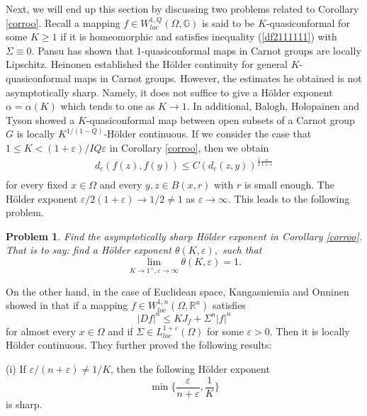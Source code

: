 \documentclass[11pt,twoside]{article}
\newtheorem{prob}[thm]{Problem}
\theoremstyle{definition}
\theoremstyle{remark}
\begin{document}
Next, we will end up this section by discussing two problems related to  Corollary \ref{corroo}. Recall a mapping $f\in W_{loc}^{1,Q}(\Omega,\mathbb{G})$ is said to be $K$-quasiconformal for some $K\geq1$ if it is homeomorphic and satisfies inequality (\ref{df2111111}) with $\Sigma\equiv0.$ Pansu \cite{Pan89}  has shown that 1-quasiconformal maps in Carnot groups are locally Lipschitz. Heinonen \cite{Hei95}  established the H\"{o}lder continuity for general $K$-quasiconformal maps in Carnot groups. However, the estimates he obtained is not asymptotically sharp. Namely, it does not suffice to give a H\"{o}lder exponent $\alpha=\alpha(K)$ which tends to one as $K\rightarrow1$. In additional, Balogh, Holopainen  and Tyson \cite{BHT02} showed a $K$-quasiconformal map between open subsets of a Carnot group $G$ is locally $K^{1/(1-Q)}$-H\"{o}lder continuous. If we consider the case that $1\leq K<(1+\varepsilon)/IQ\varepsilon$ in Corollary \ref{corroo}, then we obtain
  \begin{equation}
 \begin{aligned}
d_{c}(f(z),f(y))
\leq C(d_{c}(z,y))^{\frac{1}{2}\frac{\varepsilon}{1+\varepsilon}}\\
\end{aligned}
\end{equation}
for every fixed $x\in\Omega$ and every $y,z\in B(x,r)$ with $r$ is small enough. The H\"{o}lder exponent $\varepsilon/2(1+\varepsilon)\rightarrow1/2\neq1$ as $\varepsilon\rightarrow\infty.$
This leads to the following problem.
 \begin{prob}
 Find the asymptotically sharp H\"{o}lder exponent  in Corollary \ref{corroo}. That is to say: find a H\"{o}lder exponent $\theta(K,\varepsilon),$ such that 
 $$\lim_{K\rightarrow1^{+}, \varepsilon\rightarrow\infty}\theta(K,\varepsilon)=1.$$
 \end{prob}

On the other hand, in the case of Euclidean space, Kangasniemia and Onninen showed in \cite[Theorem 1.1]{KO221} that if a mapping $f\in W_{loc}^{1,n}(\Omega,\mathbb{R}^{n})$ satisfies
 $$\vert Df\vert^{n}\leq K J_{f}+\Sigma^{n}\vert f\vert^{n}$$
  for almost every $x\in\Omega$ and if $\Sigma\in L_{loc}^{1+\varepsilon}(\Omega)$ for some $\varepsilon>0.$ Then it is locally H\"{o}lder continuous. They further proved the following results:
  
   (i) If $\varepsilon/(n+\varepsilon)\neq1/K$, then the following H\"{o}lder exponent  $$\min\{\frac{\varepsilon}{n+\varepsilon},\frac{1}{K}\}$$
   is sharp.
    
\end{document}
